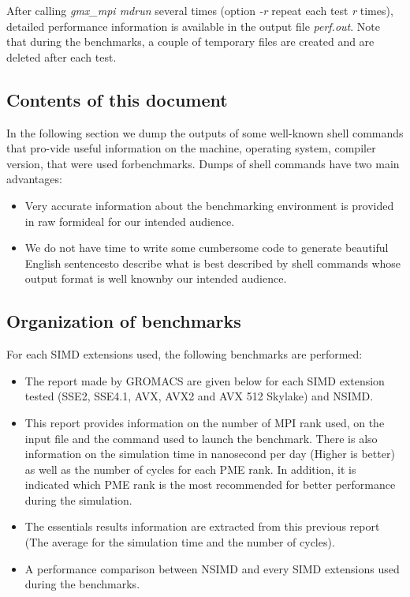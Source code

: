 	After calling \textit{gmx\_mpi mdrun} several times (option \textit{-r} repeat each test \textit{r} times), detailed performance information is available in the output file \textit{perf.out}. Note that during the benchmarks, a couple of temporary files are created and are deleted after each test. 
	
	\subsection{Contents of this document}
	
	In the following section we dump the outputs of some well-known shell commands that pro-vide useful information on the machine, operating system, compiler version, that were used forbenchmarks. Dumps of shell commands have two main advantages:
	
	\begin{itemize}
	\item Very accurate information about the benchmarking environment is provided in raw formideal for our intended audience.
	\item We do not have time to write some cumbersome code to generate beautiful English sentencesto describe what is best described by shell commands whose output format is well knownby our intended audience.
	\end{itemize}
	
		
	\subsection{Organization of benchmarks} 
	
For each SIMD extensions used, the following benchmarks are performed:
	
	\begin{itemize}
	\item The report made by GROMACS are given below for each SIMD extension tested (SSE2, SSE4.1, AVX, AVX2 and AVX 512 Skylake) and NSIMD. 
	
	\item This report provides information on the number of MPI rank used, on the input file and the command used to launch the benchmark. There is also information on the simulation time in nanosecond per day (Higher is better) as well as the number of cycles for each PME rank. In addition, it is indicated which PME rank is the most recommended for better performance during the simulation.

	\item The essentials results information are extracted from this previous report (The average for the simulation time and the number of cycles). 
	
	\item A performance comparison between NSIMD and every SIMD extensions used during the benchmarks.
	\end{itemize}
	
